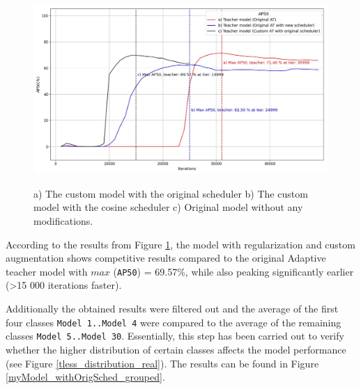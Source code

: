 \begin{figure}[htb]
	\begin{center}
		\includegraphics[width=14cm]{./AP50_myModel_origScheduler.jpg}
	\end{center}
	\caption{a) The custom model with the original scheduler b) The custom model with the cosine scheduler c) Original model without any modifications.}
	\begin{center}
		\label{myModel_withOrigSched}
	\end{center}
\end{figure}
\FloatBarrier  

According to the results from Figure \ref{myModel_withOrigSched}, the model with regularization and custom augmentation shows competitive results compared to the original Adaptive teacher model with $max$ (\texttt{AP50}) = 69.57\%, while also peaking significantly earlier (>15 000 iterations faster).  

Additionally the obtained results were filtered out and the average of the first four classes \texttt{Model 1..Model 4} were compared to the average of the remaining classes \texttt{Model 5..Model 30}. Essentially, this step has been carried out to verify whether the higher distribution of certain classes affects the model performance (see Figure \ref{tless_distribution_real}). The results can be found in Figure \ref{myModel_withOrigSched_grouped}. 
    
